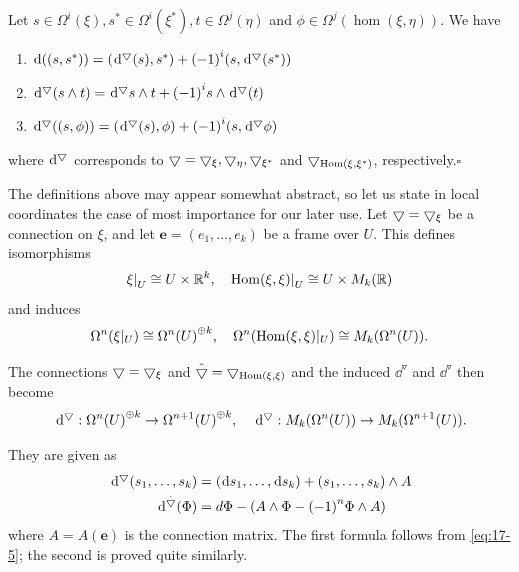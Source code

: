 \begin{lemma}\label{lemma:17-12}
Let $s \in  \Omega^{i}(\xi),s^* \in  \Omega^{i}( \xi^*),t \in  \Omega^{j}( \eta )$ and $\phi  \in  \Omega^{j}( {\hom( \xi, \eta) })$. 
We have
\begin{enumerate}
  \item $\dd( ( {s,s^*}) )  = ( {\dd^\btd(s),s^*})  + {(-1) }^{i}( {s,\dd^\btd( s^*) })$
  \item $\dd^\btd( {s \land  t})  = \dd^\btd s \land  t + {(-1) }^{i}s \land  \dd^\btd(t)$
  \item $\dd^\btd( ( {s,\phi }) )  = ( {\dd^\btd(s),\phi })  + {(-1) }^{i}( {s,\dd^\btd\phi })$ 
\end{enumerate}

where $\dd^\btd$ corresponds to $\bigtriangledown  = \bigtriangledown_{\xi },\bigtriangledown_{\eta },\bigtriangledown_{\xi^*}$ 
and $\bigtriangledown_{\operatorname{Hom}( {\xi,\xi^*}) }$, respectively.\hfill$\square$
\end{lemma}

The definitions above may appear somewhat abstract, so let us state in local coordinates the case of most 
importance for our later use. Let $\bigtriangledown = \bigtriangledown_{\xi }$ be a connection on $\xi$, and 
let $\mathbf{e} = ( {{e}_1,\ldots,{e}_{k}})$ be a frame over $U$. This defines isomorphisms
\[
  {\xi|}_{U} \cong  U \times{\ensuremath{\mathbb{R}}}^{k},\quad 
  {\operatorname{Hom}(\xi, \xi)|}_U \cong  U \times  {M}_{k}( {\mathbb{R}})
\]
and induces
\[
  \Omega^{n}(\xi|_U)  \cong  \Omega^{n}{( U) }^{\oplus k},\quad
  \Omega^{n}(\operatorname{Hom}(\xi, \xi)|_U) \cong  {M}_{k}(\Omega^{n}(U)).
\]

The connections $\bigtriangledown = \bigtriangledown_{\xi }$ and $\hat{\bigtriangledown} = \bigtriangledown_{\operatorname{Hom}(\xi, \xi)}$ and the 
induced $\dd^\triangledown$ and $\dd^\triangledown$ then become
\[
  \dd^\btd:\Omega^{n}{(U) }^{\oplus k} \ra  \Omega^{n + 1}{(U) }^{\oplus k},\quad
  \dd^\btd:{M}_{k}(\Omega^{n}(U))  \ra  {M}_{k}(\Omega^{n + 1}(U)).
\]

They are given as
\begin{align}\label{eq:17-17}
  \begin{aligned}
    \dd^\btd( {{s}_1,\ldots,{s}_{k}})  & = ( {\!\dd{s}_1,\ldots,\!\dd{s}_{k}})  + ( {{s}_1,\ldots,{s}_{k}})  \land  A\\
    \dd^{\hat\btd}( \Phi ) & = {d\Phi }- ( {A \land  \Phi - {(-1) }^{n}\Phi  \land  A})
  \end{aligned}
\end{align}
where $A = A( \mathbf{e})$ is the connection matrix. The first formula follows from \eqref{eq:17-5}; the second is 
proved quite similarly.

